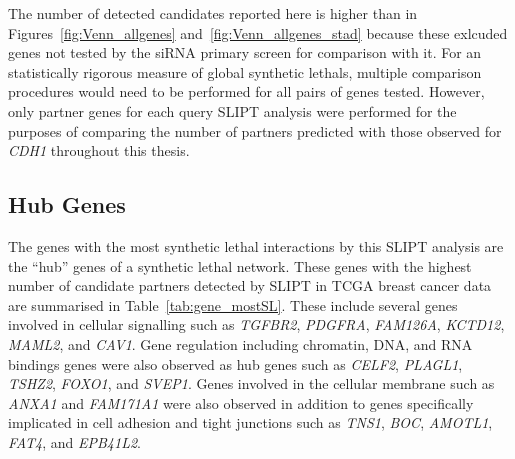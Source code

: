 The number of detected candidates reported here is higher than in Figures~\ref{fig:Venn_allgenes} and~\ref{fig:Venn_allgenes_stad} because these exlcuded genes not tested by the \gls{siRNA} primary screen \citep{Telford2015} for comparison with it. For an statistically rigorous measure of global \glspl{synthetic lethal}, multiple comparison procedures would need to be performed for all pairs of genes tested. However, only partner genes for each query \gls{SLIPT} analysis were performed for the purposes of comparing the number of partners predicted with those observed for \textit{CDH1} throughout this thesis.


\FloatBarrier

\subsection{Hub Genes}

The genes with the most \gls{synthetic lethal} interactions by this \gls{SLIPT} analysis are the ``hub'' genes of a \gls{synthetic lethal} network. These genes with the highest number of candidate partners detected by \gls{SLIPT} in \gls{TCGA} breast cancer  data are summarised in Table~\ref{tab:gene_mostSL}.  These include several genes involved in cellular signalling such as \textit{TGFBR2}, \textit{PDGFRA}, \textit{FAM126A}, \textit{KCTD12}, \textit{MAML2}, and \textit{CAV1}. Gene regulation including chromatin, \acrshort{DNA}, and \acrshort{RNA} bindings genes were also observed as hub genes such as \textit{CELF2}, \textit{PLAGL1}, \textit{TSHZ2}, \textit{FOXO1}, and \textit{SVEP1}. Genes involved in the cellular membrane such as \textit{ANXA1} and \textit{FAM171A1} were also observed in addition to genes specifically implicated in cell adhesion and tight junctions such as \textit{TNS1}, \textit{BOC}, \textit{AMOTL1}, \textit{FAT4}, and \textit{EPB41L2}.

